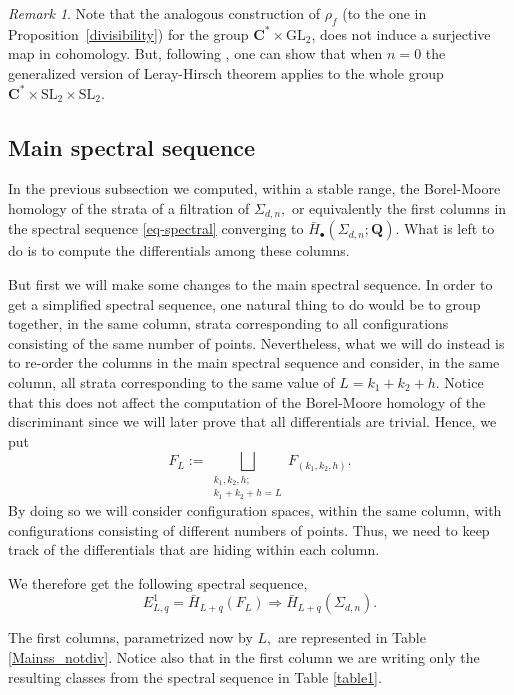 \documentclass[10pt,a4paper,twoside]{amsart}
\theoremstyle{plain}
\theoremstyle{definition}
\theoremstyle{remark}
\newtheorem{rk}{Remark}[section]
\begin{document}
\begin{rk} \label{rmk-gps}
Note that the analogous construction of $\rho_f$ (to the one in Proposition~\ref{divisibility}) for the group $\mathbf{C}^*\times\mathrm{GL}_2$, does not induce a surjective map in cohomology. 
But, following \cite[Section 3.1]{TomM4}, one can show that when $n=0$ the generalized version of Leray-Hirsch theorem applies to the whole group $\mathbf{C}^*\times \mathrm{SL}_2\times \mathrm{SL}_2$. 
\end{rk}

\subsection{Main spectral sequence} \label{sec-main}
In the previous subsection we 
computed, within a stable range, the Borel-Moore homology of the strata of a filtration of $\Sigma_{d,n},$ or equivalently the first columns in the spectral sequence \eqref{eq-spectral} converging to $\bar{H}_\bullet(\Sigma_{d,n};\mathbf{Q}).$
What is left to do is to compute  
the differentials among these columns.

But first we will make some changes to the main spectral sequence. 
In order to get a simplified spectral sequence, one natural thing to do would be to group together, in the same column, strata corresponding to all configurations consisting of the same number of points.
Nevertheless, what we will do instead is to re-order the columns in the main spectral sequence and consider, in the same column, all strata corresponding to the same value of $L=k_1+k_2+h$. Notice that this does not affect the computation of the Borel-Moore homology of the discriminant since we will later prove that all differentials are trivial.
Hence, we put 
$$F_L:=\bigsqcup_{\substack{k_1,k_2,h; \\ k_1+k_2+h=L}}F_{(k_1,k_2,h)}.$$
By doing so we will consider configuration spaces, within the same column, with configurations consisting of different numbers of points. Thus, we need to keep track of the differentials that are hiding within each column.

We therefore get the following spectral sequence, 
\begin{equation}\label{ss3}
E^1_{L,q}=\bar{H}_{L+q}(F_{L}) \Rightarrow \bar{H}_{L+q}(\Sigma_{d,n}).
\end{equation}

The first columns, parametrized now by $L,$ are represented in Table \ref{Mainss_notdiv}. Notice also that in the first column we are writing only the resulting classes from the spectral sequence in Table \ref{table1}.
\end{document}
